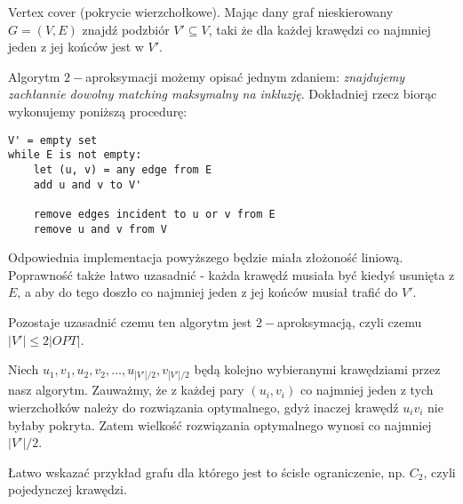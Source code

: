 Vertex cover (pokrycie wierzchołkowe). Mając dany graf nieskierowany $G=(V,E)$ znajdź podzbiór $V' \subseteq V$, taki że dla każdej krawędzi co najmniej jeden z jej końców jest w $V'$.

Algorytm $2-$aproksymacji możemy opisać jednym zdaniem: \textit{znajdujemy zachłannie dowolny matching maksymalny na inkluzję}. Dokładniej rzecz biorąc wykonujemy poniższą procedurę:

\begin{verbatim}
V' = empty set
while E is not empty:
    let (u, v) = any edge from E
    add u and v to V'
    
    remove edges incident to u or v from E
    remove u and v from V
\end{verbatim}

Odpowiednia implementacja powyższego będzie miała złożoność liniową. Poprawność także łatwo uzasadnić - każda krawędź musiała być kiedyś usunięta z $E$, a aby do tego doszło co najmniej jeden z jej końców musiał trafić do $V'$.

Pozostaje uzasadnić czemu ten algorytm jest $2-$aproksymacją, czyli czemu \(|V'| \leqslant 2 |OPT|\).

Niech $u_1, v_1, u_2, v_2, \ldots, u_{|V'|/2}, v_{|V'|/2}$ będą kolejno wybieranymi krawędziami przez nasz algorytm. Zauważmy, że z każdej pary $(u_i, v_i)$ co najmniej jeden z tych wierzchołków należy do rozwiązania optymalnego, gdyż inaczej krawędź $u_iv_i$ nie byłaby pokryta. Zatem wielkość rozwiązania optymalnego wynosi co najmniej $|V'|/2$. 

Łatwo wskazać przykład grafu dla którego jest to ścisłe ograniczenie, np. $C_2$, czyli pojedynczej krawędzi.